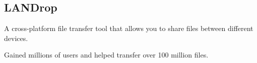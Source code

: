 \documentclass[]{deedy-resume-openfont}
\begin{document}
\begin{minipage}[t]{0.66\textwidth}
\subsection{LANDrop}
\begin{tightemize}
\item A cross-platform file transfer tool that allows you to share files between different devices.
\item Gained millions of users and helped transfer over 100 million files.
\end{tightemize}

\end{minipage} 
\end{document}
